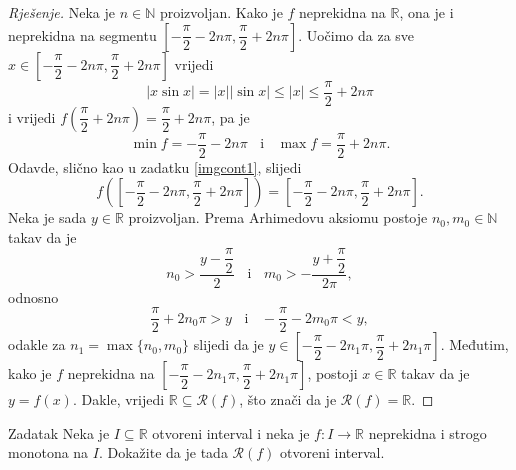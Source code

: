 \begin{proof}[Rješenje]
Neka je \(n\in \mathbb{N}\) proizvoljan. Kako je \(f\) neprekidna na \(\mathbb{R}\), ona je i neprekidna na segmentu \(\left[-\dfrac{\pi}{2}-2n\pi, \dfrac{\pi}{2}+2n\pi\right]\). Uočimo da za sve \(x\in \left[-\dfrac{\pi}{2}-2n\pi, \dfrac{\pi}{2}+2n\pi\right]\) vrijedi 
\[|x\sin{x}|=|x||\sin{x}|\leq |x|\leq \dfrac{\pi}{2}+2n\pi\]
i vrijedi \(f\left(\dfrac{\pi}{2}+2n\pi\right)=\dfrac{\pi}{2}+2n\pi\), pa je \[\min{f}=-\dfrac{\pi}{2}-2n\pi\;\;\text{ i }\;\;\max{f}=\dfrac{\pi}{2}+2n\pi.\]
Odavde, slično kao u zadatku \ref{imgcont1}, slijedi \[f\left(\left[-\dfrac{\pi}{2}-2n\pi, \dfrac{\pi}{2}+2n\pi\right]\right)=\left[-\dfrac{\pi}{2}-2n\pi, \dfrac{\pi}{2}+2n\pi\right].\]
Neka je sada \(y\in \mathbb{R}\) proizvoljan. Prema Arhimedovu aksiomu postoje \(n_0, m_0\in \mathbb{N}\) takav da je 
\[n_0>\dfrac{y-\dfrac{\pi}{2}}{2}\;\;\text{ i }\;\; m_0>-\dfrac{y+\dfrac{\pi}{2}}{2\pi},\]
odnosno
\[\dfrac{\pi}{2}+2n_0\pi>y\;\;\text{ i }\;\;-\dfrac{\pi}{2}-2m_0\pi<y,\]
odakle za \(n_1=\max\{n_0, m_0\}\) slijedi da je \(y\in \left[-\dfrac{\pi}{2}-2n_1\pi, \dfrac{\pi}{2}+2n_1\pi\right]\). Međutim, kako je \(f\) neprekidna na \(\left[-\dfrac{\pi}{2}-2n_1\pi, \dfrac{\pi}{2}+2n_1\pi\right]\), postoji \(x\in \mathbb{R}\) takav da je \(y=f(x)\). Dakle, vrijedi \(\mathbb{R}\subseteq \mathcal{R}(f)\), što znači da je \(\mathcal{R}(f)=\mathbb{R}\).
\end{proof}
\begin{exercise}{Zadatak}
Neka je \(I\subseteq \mathbb{R}\) otvoreni interval i neka je \(f : I\to \mathbb{R}\) neprekidna i strogo monotona na \(I\). Dokažite da je tada \(\mathcal{R}(f)\) otvoreni interval.
\end{exercise}
